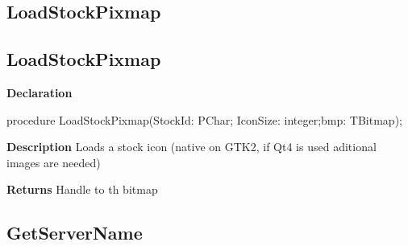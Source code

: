 \documentclass{report}
\newif\ifpdf
\begin{document}
\subsection*{\large{\textbf{LoadStockPixmap}}\normalsize\hspace{1ex}\hrulefill}
\else
\subsection*{LoadStockPixmap}
\fi
\label{common-LoadStockPixmap}
\begin{list}{}{
\setlength{\itemindent}{0cm}
\setlength{\listparindent}{0cm}
\setlength{\leftmargin}{\evensidemargin}
\addtolength{\leftmargin}{\tmplength}
\settowidth{\labelsep}{X}
\addtolength{\leftmargin}{\labelsep}
\setlength{\labelwidth}{\tmplength}
}
\item[\textbf{Declaration}\hfill]
\ifpdf
\begin{flushleft}
\fi
\begin{ttfamily}
procedure LoadStockPixmap(StockId: PChar; IconSize: integer;bmp: TBitmap);\end{ttfamily}

\ifpdf
\end{flushleft}
\fi

\par
\item[\textbf{Description}]
Loads a stock icon (native on GTK2, if Qt4 is used aditional images are needed) \par
\item[\textbf{Returns}]Handle to th bitmap


\end{list}
\ifpdf
\subsection*{\large{\textbf{GetServerName}}\normalsize\hspace{1ex}\hrulefill}
\else
\end{document}
